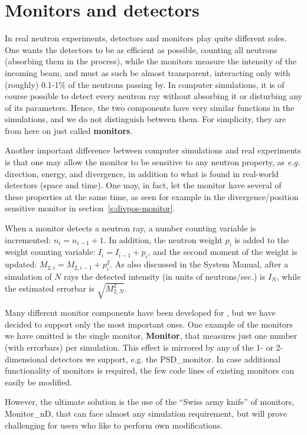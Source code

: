\chapter{Monitors and detectors}

In real neutron experiments, detectors and monitors play quite
different roles. One wants the detectors to be as efficient as
possible, counting all neutrons (absorbing them in the process),
while the monitors measure the intensity of the incoming beam, and must
as such be almost transparent, interacting only with (roughly) 0.1-1\%
of the neutrons passing by. In computer simulations, it is
of course possible to detect every neutron ray without
absorbing it or disturbing any of its parameters. Hence, the two components
have very similar functions in the simulations, and we do
not distinguish between them. For simplicity, they are from here on
just called {\bf monitors}.

Another important difference between computer simulations
and real experiments is
that one may allow the monitor to be sensitive to any neutron property,
as {\em e.g.} direction, energy, and divergence, in addition to what
is found in real-world detectors (space and time). One may, in
fact, let the monitor have several of these properties at the same time,
as seen for example in the divergence/position sensitive monitor in
section~\ref{s:divpos-monitor}.

When a monitor detects a neutron ray,
a number counting variable is incremented: $n_i = n_{i-1}+1$.
In addition, the neutron
weight $p_i$ is added to the weight counting variable:
$I_i = I_{i-1} + p_i$,
and the second moment of the weight is
updated: $M_{2,i} = M_{2,i-1} + p_i^2$.
As also discussed in the System Manual, after a simulation of $N$ rays
the detected intensity (in units of neutrons/sec.) is $I_N$,
while the estimated errorbar is $\sqrt{M_{2,N}^2}$.

Many different monitor components have been developed for
\MCS , but we have decided to support only the most important ones.
One example of the monitors we have omitted is the single monitor,
{\bf Monitor},
that measures just one number (with errorbars) per simulation.
This effect is mirrored by any of the 1- or 2-dimensional detectors
we support, e.g. the {\rm PSD\_monitor}.
In case additional functionality of monitors is required,
the few code lines of existing monitors can easily be modified.

However, the ultimate solution is the use of the
``Swiss army knife'' of monitors, {\rm Monitor\_nD}, that can face
almost any simulation requirement,
but will prove challenging for users who like to perform own modifications.

\newpage


\newpage


\newpage


\newpage


\newpage


\newpage


\newpage

